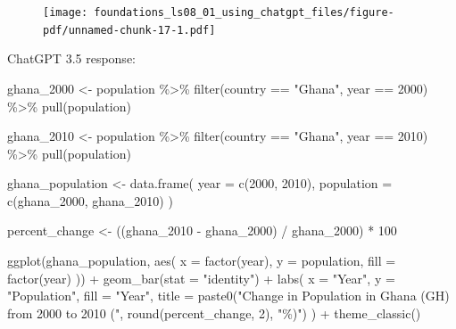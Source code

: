 \documentclass[
  letterpaper,
  DIV=11,
  numbers=noendperiod]{scrreprt}
\newenvironment{Shaded}{\begin{snugshade}}{\end{snugshade}}
\newcommand{\AttributeTok}[1]{\textcolor[rgb]{0.40,0.45,0.13}{#1}}
\newcommand{\DecValTok}[1]{\textcolor[rgb]{0.68,0.00,0.00}{#1}}
\newcommand{\FunctionTok}[1]{\textcolor[rgb]{0.28,0.35,0.67}{#1}}
\newcommand{\NormalTok}[1]{\textcolor[rgb]{0.00,0.23,0.31}{#1}}
\newcommand{\OtherTok}[1]{\textcolor[rgb]{0.00,0.23,0.31}{#1}}
\newcommand{\SpecialCharTok}[1]{\textcolor[rgb]{0.37,0.37,0.37}{#1}}
\newcommand{\StringTok}[1]{\textcolor[rgb]{0.13,0.47,0.30}{#1}}
\begin{document}
\begin{figure}[H]

{\centering \texttt{[image: foundations\_ls08\_01\_using\_chatgpt\_files/figure-pdf/unnamed-chunk-17-1.pdf]}

}

\end{figure}

ChatGPT 3.5 response:

\hypertarget{chatgpt}{}
\begin{Shaded}
\begin{Highlighting}[]
\NormalTok{ghana\_2000 }\OtherTok{\textless{}{-}}\NormalTok{ population }\SpecialCharTok{\%\textgreater{}\%}
  \FunctionTok{filter}\NormalTok{(country }\SpecialCharTok{==} \StringTok{"Ghana"}\NormalTok{, year }\SpecialCharTok{==} \DecValTok{2000}\NormalTok{) }\SpecialCharTok{\%\textgreater{}\%}
  \FunctionTok{pull}\NormalTok{(population)}

\NormalTok{ghana\_2010 }\OtherTok{\textless{}{-}}\NormalTok{ population }\SpecialCharTok{\%\textgreater{}\%}
  \FunctionTok{filter}\NormalTok{(country }\SpecialCharTok{==} \StringTok{"Ghana"}\NormalTok{, year }\SpecialCharTok{==} \DecValTok{2010}\NormalTok{) }\SpecialCharTok{\%\textgreater{}\%}
  \FunctionTok{pull}\NormalTok{(population)}

\NormalTok{ghana\_population }\OtherTok{\textless{}{-}} \FunctionTok{data.frame}\NormalTok{(}
  \AttributeTok{year =} \FunctionTok{c}\NormalTok{(}\DecValTok{2000}\NormalTok{, }\DecValTok{2010}\NormalTok{),}
  \AttributeTok{population =} \FunctionTok{c}\NormalTok{(ghana\_2000, ghana\_2010)}
\NormalTok{)}

\NormalTok{percent\_change }\OtherTok{\textless{}{-}}\NormalTok{ ((ghana\_2010 }\SpecialCharTok{{-}}\NormalTok{ ghana\_2000) }\SpecialCharTok{/}\NormalTok{ ghana\_2000) }\SpecialCharTok{*} \DecValTok{100}

\FunctionTok{ggplot}\NormalTok{(ghana\_population, }\FunctionTok{aes}\NormalTok{(}
  \AttributeTok{x =} \FunctionTok{factor}\NormalTok{(year),}
  \AttributeTok{y =}\NormalTok{ population,}
  \AttributeTok{fill =} \FunctionTok{factor}\NormalTok{(year)}
\NormalTok{)) }\SpecialCharTok{+}
  \FunctionTok{geom\_bar}\NormalTok{(}\AttributeTok{stat =} \StringTok{"identity"}\NormalTok{) }\SpecialCharTok{+}
  \FunctionTok{labs}\NormalTok{(}
    \AttributeTok{x =} \StringTok{"Year"}\NormalTok{,}
    \AttributeTok{y =} \StringTok{"Population"}\NormalTok{,}
    \AttributeTok{fill =} \StringTok{"Year"}\NormalTok{,}
    \AttributeTok{title =} \FunctionTok{paste0}\NormalTok{(}\StringTok{"Change in Population in Ghana (GH) from 2000 to 2010 ("}\NormalTok{,}
                   \FunctionTok{round}\NormalTok{(percent\_change, }\DecValTok{2}\NormalTok{),}
                   \StringTok{"\%)"}\NormalTok{)}
\NormalTok{  ) }\SpecialCharTok{+}
  \FunctionTok{theme\_classic}\NormalTok{()}
\end{Highlighting}
\end{Shaded}
\end{document}
